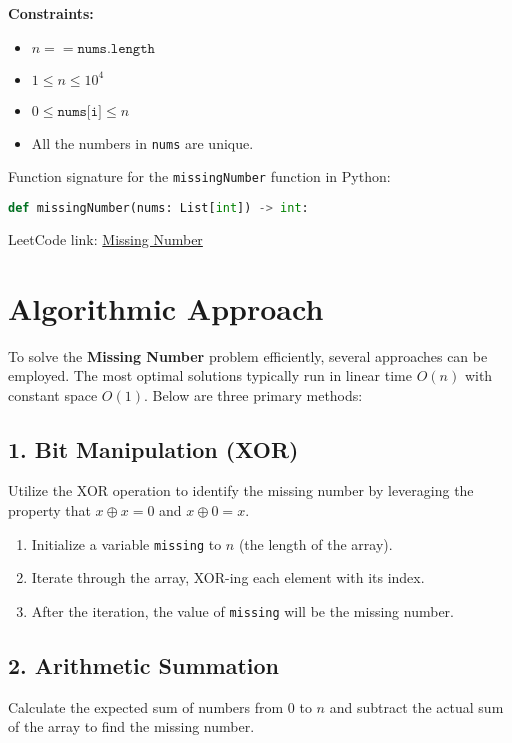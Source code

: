 \textbf{Constraints:}

\begin{itemize}
    \item \(n == \texttt{nums.length}\)
    \item \(1 \leq n \leq 10^4\)
    \item \(0 \leq \texttt{nums[i]} \leq n\)
    \item All the numbers in \texttt{nums} are unique.
\end{itemize}

Function signature for the \texttt{missingNumber} function in Python:

\begin{lstlisting}[language=Python]
def missingNumber(nums: List[int]) -> int:
\end{lstlisting}

LeetCode link: \href{https://leetcode.com/problems/missing-number/}{Missing Number}

\section*{Algorithmic Approach}

To solve the \textbf{Missing Number} problem efficiently, several approaches can be employed. The most optimal solutions typically run in linear time \(O(n)\) with constant space \(O(1)\). Below are three primary methods:

\subsection*{1. Bit Manipulation (XOR)}
Utilize the XOR operation to identify the missing number by leveraging the property that \(x \oplus x = 0\) and \(x \oplus 0 = x\).

\begin{enumerate}
    \item Initialize a variable \texttt{missing} to \(n\) (the length of the array).
    \item Iterate through the array, XOR-ing each element with its index.
    \item After the iteration, the value of \texttt{missing} will be the missing number.
\end{enumerate}

\subsection*{2. Arithmetic Summation}
Calculate the expected sum of numbers from \(0\) to \(n\) and subtract the actual sum of the array to find the missing number.

